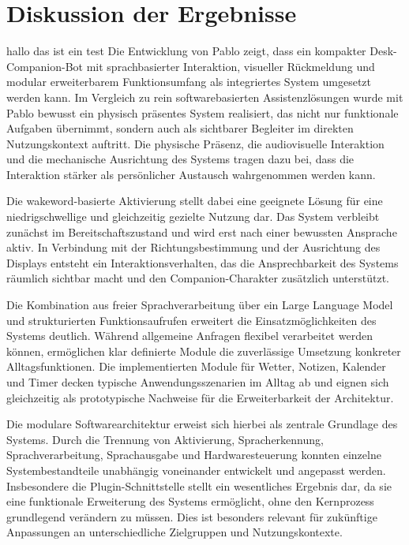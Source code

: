 \section{Diskussion der Ergebnisse}
hallo das ist ein test 
Die Entwicklung von Pablo zeigt, dass ein kompakter Desk-Companion-Bot mit sprachbasierter Interaktion, visueller Rückmeldung und modular erweiterbarem Funktionsumfang als integriertes System umgesetzt werden kann. Im Vergleich zu rein softwarebasierten Assistenzlösungen wurde mit Pablo bewusst ein physisch präsentes System realisiert, das nicht nur funktionale Aufgaben übernimmt, sondern auch als sichtbarer Begleiter im direkten Nutzungskontext auftritt. Die physische Präsenz, die audiovisuelle Interaktion und die mechanische Ausrichtung des Systems tragen dazu bei, dass die Interaktion stärker als persönlicher Austausch wahrgenommen werden kann.

Die wakeword-basierte Aktivierung stellt dabei eine geeignete Lösung für eine niedrigschwellige und gleichzeitig gezielte Nutzung dar. Das System verbleibt zunächst im Bereitschaftszustand und wird erst nach einer bewussten Ansprache aktiv. In Verbindung mit der Richtungsbestimmung und der Ausrichtung des Displays entsteht ein Interaktionsverhalten, das die Ansprechbarkeit des Systems räumlich sichtbar macht und den Companion-Charakter zusätzlich unterstützt.

Die Kombination aus freier Sprachverarbeitung über ein Large Language Model und strukturierten Funktionsaufrufen erweitert die Einsatzmöglichkeiten des Systems deutlich. Während allgemeine Anfragen flexibel verarbeitet werden können, ermöglichen klar definierte Module die zuverlässige Umsetzung konkreter Alltagsfunktionen. Die implementierten Module für Wetter, Notizen, Kalender und Timer decken typische Anwendungsszenarien im Alltag ab und eignen sich gleichzeitig als prototypische Nachweise für die Erweiterbarkeit der Architektur.

Die modulare Softwarearchitektur erweist sich hierbei als zentrale Grundlage des Systems. Durch die Trennung von Aktivierung, Spracherkennung, Sprachverarbeitung, Sprachausgabe und Hardwaresteuerung konnten einzelne Systembestandteile unabhängig voneinander entwickelt und angepasst werden. Insbesondere die Plugin-Schnittstelle stellt ein wesentliches Ergebnis dar, da sie eine funktionale Erweiterung des Systems ermöglicht, ohne den Kernprozess grundlegend verändern zu müssen. Dies ist besonders relevant für zukünftige Anpassungen an unterschiedliche Zielgruppen und Nutzungskontexte.

